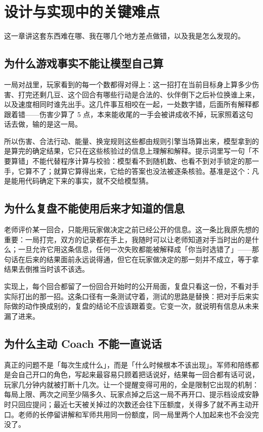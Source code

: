 \section{设计与实现中的关键难点}

这一章讲这套东西难在哪、我在哪几个地方差点做错，以及我是怎么发现的。

\subsection{为什么游戏事实不能让模型自己算}

一局对战里，玩家看到的每一个数都得对得上：这一招打在当前目标身上算多少伤害、打完还剩几豆、这个回合有哪些行动是合法的、伙伴倒下之后补位换谁上来，以及速度相同时谁先出手。这几件事互相咬在一起，一处数字错，后面所有解释都跟着错——伤害少算了 5 点，本来能收尾的一手会被讲成收不掉，玩家照着这句话去做，输的是这一局。

所以伤害、合法行动、能量、换宠规则这些都由规则引擎当场算出来，模型拿到的是算完的确定结果，它只在这些核验过的信息上理解和解释。提示词里写一句「不要算错」不能代替程序计算与校验：模型看不到随机数、也看不到对手锁定的那一手，它算不了；就算它算得出来，它给的答案也没法被逐条核验。基准是这个：凡是能用代码确定下来的事实，就不交给模型猜。

\subsection{为什么复盘不能使用后来才知道的信息}

老师评价某一回合，只能用玩家做决定之前已经公开的信息。这一条比我原先想的重要：一局打完，双方的记录都在手上，我随时可以让老师知道对手当时出的是什么；一旦允许它用这条信息，任何一次失败都能被解释成「你当时选错了」——那句话在后来的结果面前永远说得通，但它在玩家做决定的那一刻并不成立，等于拿结果去倒推当时该不该选。

实现上，每个回合都留了一份回合开始时的公开局面，复盘只看这一份，不看对手实际打出的那一招。这条口径有一条测试守着，测试的思路是替换：把对手后来实际做的动作换成别的，复盘的结论不应该跟着变。它变一次，就说明有信息从未来漏了进来。

\subsection{为什么主动 Coach 不能一直说话}

真正的问题不是「每次生成什么」，而是「什么时候根本不该出现」。军师和陪练都是会自己开口的角色，写起来最容易只顾着把话说好，结果每一回合都有话可说，玩家几分钟内就被打断十几次。让一个提醒变得可用的，全是限制它出现的机制：每局上限、两次之间至少隔多久、玩家点掉之后这一局不再开口、提示档设成安静时只回应提问；最近七天被关掉过的次数还会往下压额度，关得多了就不再主动开口。老师的长停留讲解和军师共用同一份额度，同一局里两个人加起来也不会没完没了。


